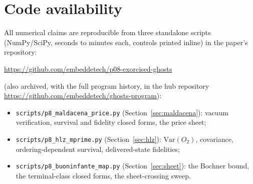 \documentclass[11pt]{article}
\theoremstyle{definition}
\theoremstyle{remark}
\begin{document}
\section*{Code availability}
\label{sec:code}

All numerical claims are reproducible from three standalone scripts
(NumPy/SciPy, seconds to minutes each, controls printed inline) in
the paper's repository:
\begin{center}
\url{https://github.com/embeddetech/p08-exorcised-ghosts}
\end{center}
(also archived, with the full program history, in the hub repository
\url{https://github.com/embeddetech/ghosts-program}):
\begin{itemize}
\item \texttt{scripts/p8\_maldacena\_price.py}
(Section~\ref{sec:maldacena}): vacuum verification, survival and
fidelity closed forms, the price sheet;
\item \texttt{scripts/p8\_hlz\_mprime.py}
(Section~\ref{sec:hlz}): $\mathrm{Var}(O_{2})$, covariance,
ordering-dependent survival, delivered-state fidelities;
\item \texttt{scripts/p8\_buoninfante\_map.py}
(Section~\ref{sec:sheet}): the Bochner bound, the terminal-class
closed forms, the sheet-crossing sweep.
\end{itemize}
\end{document}
